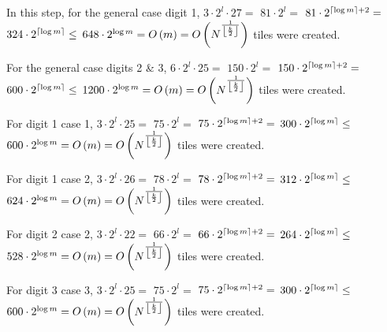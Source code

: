 \begin{itemize}
    In this step, for the general case digit 1,
    $3 \cdot 2^l \cdot 27 =$
    $81 \cdot 2^l =$
    $81 \cdot 2^{\ceil*{{\log m}} + 2} =$
    $324 \cdot 2^{\ceil*{\log m}} \leq$
    $648 \cdot 2^{\log m} = \bigom$ tiles were created.

    For the general case digits 2 \& 3,
    $6 \cdot 2^l \cdot 25 =$
    $150 \cdot 2^l =$
    $150 \cdot 2^{\ceil*{{\log m}} + 2} =$
    $600 \cdot 2^{\ceil*{\log m}} \leq$
    $1200 \cdot 2^{\log m} = \bigom$ tiles were created.

    For digit 1 case 1,
    $3 \cdot 2^l \cdot 25 =$
    $75 \cdot 2^l =$
    $75 \cdot 2^{\ceil*{{\log m}} + 2} =$
    $300 \cdot 2^{\ceil*{\log m}} \leq$
    $600 \cdot 2^{\log m} = \bigom$ tiles were created.

    For digit 1 case 2,
    $3 \cdot 2^l \cdot 26 =$
    $78 \cdot 2^l =$
    $78 \cdot 2^{\ceil*{{\log m}} + 2} =$
    $312 \cdot 2^{\ceil*{\log m}} \leq$
    $624 \cdot 2^{\log m} = \bigom$ tiles were created.

    For digit 2 case 2,
    $3 \cdot 2^l \cdot 22 =$
    $66 \cdot 2^l =$
    $66 \cdot 2^{\ceil*{{\log m}} + 2} =$
    $264 \cdot 2^{\ceil*{\log m}} \leq$
    $528 \cdot 2^{\log m} = \bigom$ tiles were created.

    For digit 3 case 3,
    $3 \cdot 2^l \cdot 25 =$
    $75 \cdot 2^l =$
    $75 \cdot 2^{\ceil*{{\log m}} + 2} =$
    $300 \cdot 2^{\ceil*{\log m}} \leq$
    $600 \cdot 2^{\log m} = \bigom$ tiles were created.


\end{itemize}
